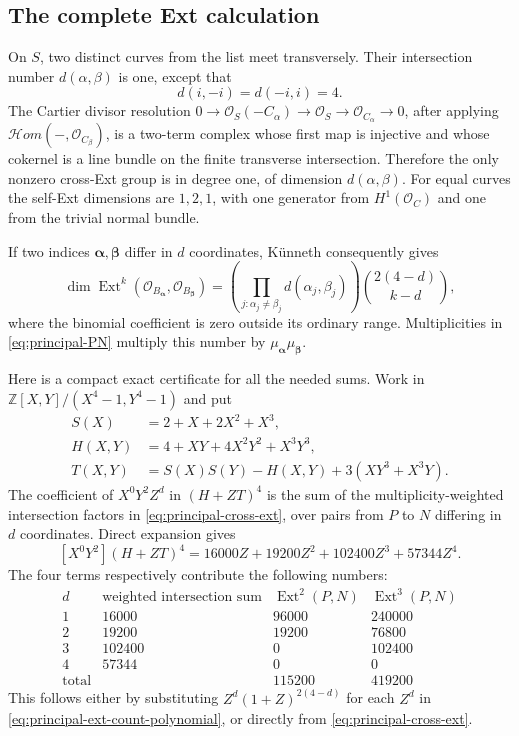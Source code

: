 \documentclass[11pt]{article}
\theoremstyle{definition}
\theoremstyle{remark}
\begin{document}
\subsection{The complete Ext calculation}

On $S$, two distinct curves from the list meet transversely.
Their intersection number $d(\alpha,\beta)$ is one, except that
\[
 d(i,-i)=d(-i,i)=4.
\]
The Cartier divisor resolution
$0\to\mathcal O_S(-C_\alpha)\to\mathcal O_S
\to\mathcal O_{C_\alpha}\to0$, after applying
$\mathcal Hom(-,\mathcal O_{C_\beta})$, is a two-term complex
whose first map is injective and whose cokernel is a line bundle
on the finite transverse intersection.  Therefore the only
nonzero cross-Ext group is in degree one, of dimension
$d(\alpha,\beta)$.  For equal curves the self-Ext dimensions are
$1,2,1$, with one generator from $H^1(\mathcal O_C)$ and one
from the trivial normal bundle.

If two indices $\boldsymbol\alpha,\boldsymbol\beta$ differ in
$d$ coordinates, K\"unneth consequently gives
\begin{equation}
 \label{eq:principal-cross-ext}
 \dim\operatorname{Ext}^k
  (\mathcal O_{B_{\boldsymbol\alpha}},
   \mathcal O_{B_{\boldsymbol\beta}})
 =\left(\prod_{j:\alpha_j\ne\beta_j}d(\alpha_j,\beta_j)\right)
    \binom{2(4-d)}{k-d},
\end{equation}
where the binomial coefficient is zero outside its ordinary
range.  Multiplicities in \eqref{eq:principal-PN} multiply this
number by $\mu_{\boldsymbol\alpha}\mu_{\boldsymbol\beta}$.

Here is a compact exact certificate for all the needed sums.
Work in $\mathbb Z[X,Y]/(X^4-1,Y^4-1)$ and put
\[
 \begin{split}
 S(X)&=2+X+2X^2+X^3,\\
 H(X,Y)&=4+XY+4X^2Y^2+X^3Y^3,\\
 T(X,Y)&=S(X)S(Y)-H(X,Y)+3(XY^3+X^3Y).
 \end{split}
\]
The coefficient of $X^0Y^2Z^d$ in $(H+ZT)^4$ is the sum of
the multiplicity-weighted intersection factors in
\eqref{eq:principal-cross-ext}, over pairs from $P$ to $N$
differing in $d$ coordinates.  Direct expansion gives
\begin{equation}
 \label{eq:principal-ext-count-polynomial}
 [X^0Y^2](H+ZT)^4
 =16000Z+19200Z^2+102400Z^3+57344Z^4.
\end{equation}
The four terms respectively contribute the following numbers:
\[
\begin{array}{c|r|r|r}
 d&\text{weighted intersection sum}
   &\operatorname{Ext}^2(P,N)&\operatorname{Ext}^3(P,N)\\ \hline
 1&16000&96000&240000\\
 2&19200&19200&76800\\
 3&102400&0&102400\\
 4&57344&0&0\\ \hline
 \text{total}&&115200&419200
\end{array}
\]
This follows either by substituting
$Z^d(1+Z)^{2(4-d)}$ for each $Z^d$ in
\eqref{eq:principal-ext-count-polynomial}, or directly from
\eqref{eq:principal-cross-ext}.
\end{document}
